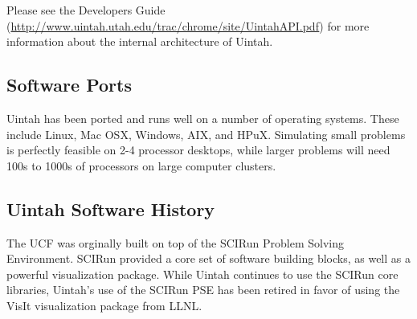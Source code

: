 Please see the Developers Guide
(\url{http://www.uintah.utah.edu/trac/chrome/site/UintahAPI.pdf}) for more
information about the internal architecture of Uintah.

\subsection{Software Ports}

Uintah has been ported and runs well on a number of operating
systems.  These include Linux, Mac OSX, Windows, AIX, and HPuX. Simulating
small problems is perfectly feasible on 2-4 processor desktops, while
larger problems will need 100s to 1000s of processors on large
computer clusters. 

\subsection{Uintah Software History}

The UCF was orginally built on top of the SCIRun Problem Solving
Environment.  SCIRun provided a core set of software building blocks,
as well as a powerful visualization package.  While Uintah continues
to use the SCIRun core libraries, Uintah's use of the SCIRun PSE has
been retired in favor of using the VisIt visualization package from
LLNL.

